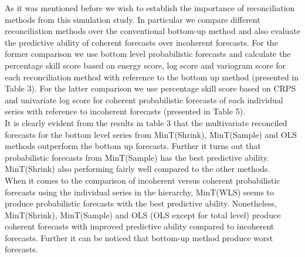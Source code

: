 \documentclass[a4paper, 11pt]{article}
\begin{document}
\noindent
As it was mentioned before we wish to establish the importance of reconciliation methods from this simulation study. In particular we compare different reconciliation methods over the conventional bottom-up method and also evaluate the predictive ability of coherent forecasts over incoherent forecasts. For the former comparison we use bottom level probabilistic forecasts and calculate the percentage skill score based on energy score, log score and variogram score for each reconciliation method with reference to the bottom up method (presented in Table 3). For the latter comparison we use percentage skill score based on CRPS and univariate log score for coherent probabilistic forecasts of each individual series with reference to incoherent forecasts (presented in Table 5).\\

\noindent
It is clearly evident from the results in table 3 that the multivariate reconciled forecasts for the bottom level series from MinT(Shrink), MinT(Sample) and OLS methods outperform the bottom up forecasts. Further it turns out that probabilistic forecasts from MinT(Sample) has the best predictive ability. MinT(Shrink) also performing fairly well compared to the other methods. \\

\noindent
When it comes to the comparison of incoherent versus coherent probabilistic forecasts using the individual series in the hierarchy, MinT(WLS) seems to produce probabilistic forecasts with the best predictive ability. Nonetheless, MinT(Shrink), MinT(Sample) and OLS (OLS except for total level) produce coherent forecasts with improved predictive ability compared to incoherent forecasts. Further it can be noticed that bottom-up method produce worst forecasts.  
\end{document}
